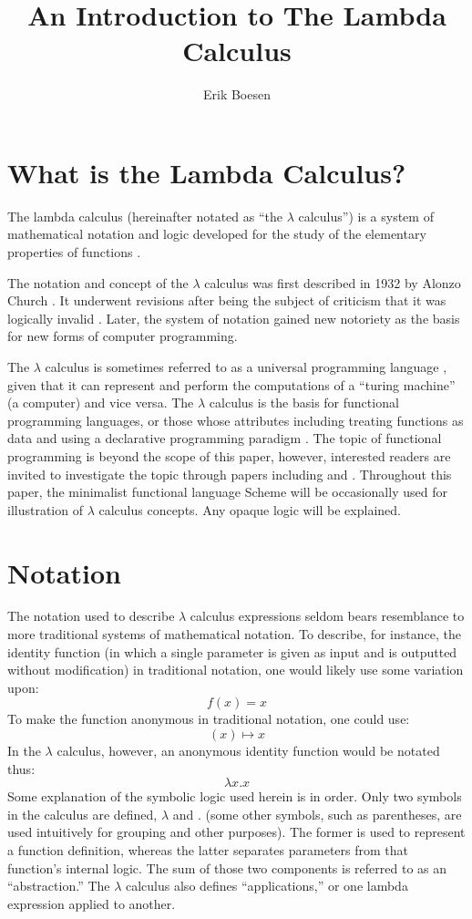 \documentclass{article}
\begin{document}
\title{An Introduction to The Lambda Calculus}
\author{Erik Boesen}
\maketitle

\begin{abstract}
\end{abstract}

\section{What is the Lambda Calculus?}
The lambda calculus (hereinafter notated as ``the $\lambda$ calculus'') is a system of mathematical notation and logic developed for the study of the elementary properties of functions \cite{rojastutorial}.

The notation and concept of the $\lambda$ calculus was first described in 1932 by Alonzo Church \cite{church}. It underwent revisions after being the subject of criticism that it was logically invalid \cite{church2}. Later, the system of notation gained new notoriety as the basis for new forms of computer programming.

The $\lambda$ calculus is sometimes referred to as a universal programming language \cite{rojastutorial}, given that it can represent and perform the computations of a ``turing machine'' (a computer) and vice versa. The $\lambda$ calculus is the basis for functional programming languages, or those whose attributes including treating functions as data and using a declarative programming paradigm \cite{hudakevolution}. The topic of functional programming is beyond the scope of this paper, however, interested readers are invited to investigate the topic through papers including \cite{totalfp} and \cite{hudakevolution}. Throughout this paper, the minimalist functional language Scheme will be occasionally used for illustration of $\lambda$ calculus concepts. Any opaque logic will be explained.

\section{Notation}
The notation used to describe $\lambda$ calculus expressions seldom bears resemblance to more traditional systems of mathematical notation. To describe, for instance, the identity function (in which a single parameter is given as input and is outputted without modification) in traditional notation, one would likely use some variation upon:
$$f(x)=x$$
To make the function anonymous in traditional notation, one could use:
$$(x) \mapsto x$$
In the $\lambda$ calculus, however, an anonymous identity function would be notated thus:
$$\lambda x.x$$
Some explanation of the symbolic logic used herein is in order. Only two symbols in the calculus are defined, $\lambda$ and $.$ (some other symbols, such as parentheses, are used intuitively for grouping and other purposes). The former is used to represent a function definition, whereas the latter separates parameters from that function's internal logic. The sum of those two components is referred to as an ``abstraction.'' The $\lambda$ calculus also defines ``applications,'' or one lambda expression applied to another.
\end{document}
